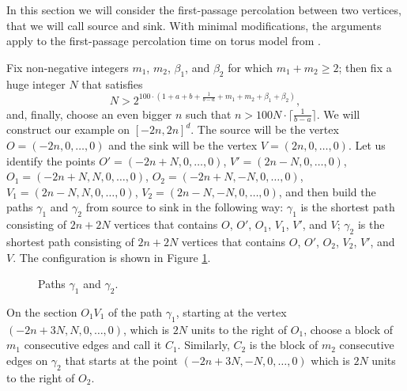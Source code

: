 \documentclass[reqno]{amsart}
\begin{document}
In this section we will consider the first-passage percolation between two vertices, that we will call source and sink. With minimal modifications, the arguments apply to the first-passage percolation time on torus model from 
\cite{benjamini2006}. 


Fix non-negative integers $m_1$, $m_2$, $\beta_1$, and $\beta_2$ for which $m_1+m_2\geq 2$; then fix a huge integer $N$ that satisfies
\[N>2^{100\cdot (1+a+b+\frac1{b-a}+m_1+m_2+\beta_1+\beta_2)},\] and, finally, choose an even bigger $n$ such that $n>100N\cdot \lceil\frac1{b-a}\rceil$. We will construct our example on $[-2n,2n]^d$. The source will be the vertex $O=(-2n,0,\dots, 0)$ and the sink will be the vertex $V=(2n,0,\dots, 0)$. 
Let us identify the points $O'=(-2n+N,0,\dots, 0)$, $V'=(2n-N,0,\dots, 0)$, $O_1=(-2n+N, N,0,\dots, 0)$, $O_2=(-2n+N,-N,0,\dots, 0)$, $V_1=(2n-N,N,0,\dots, 0)$, $V_2=(2n-N,
-N,0,\dots, 0)$, and then build the paths $\gamma_1$ and $\gamma_2$ from source to sink in the following way: 
$\gamma_1$ is the shortest path consisting of $2n+2N$ vertices that contains $O$, $O'$, $O_1$, $V_1$, $V'$, and $V$; $\gamma_2$ is the shortest path consisting of $2n+2N$ vertices that contains $O$, $O'$, $O_2$, $V_2$, $V'$, and $V$. The configuration is shown in Figure \ref{fig|disjointLanes01}.

\begin{figure}[t]
\centering
{}
\caption{Paths $\gamma_1$ and $\gamma_2$.}
\label{fig|disjointLanes01}
\end{figure}

On the section $O_1V_1$ of the path $\gamma_1$, starting at the vertex $(-2n+3N, N,0,\dots, 0)$, which is $2N$ units to the right of $O_1$, choose a block of $m_1$ consecutive edges and call it $C_1$. Similarly, $C_2$ is the block of $m_2$ consecutive edges on $\gamma_2$ that starts at the point $(-2n+3N,-N,0,\dots, 0)$ which is $2N$ units to the right of $O_2$. 
\end{document}
